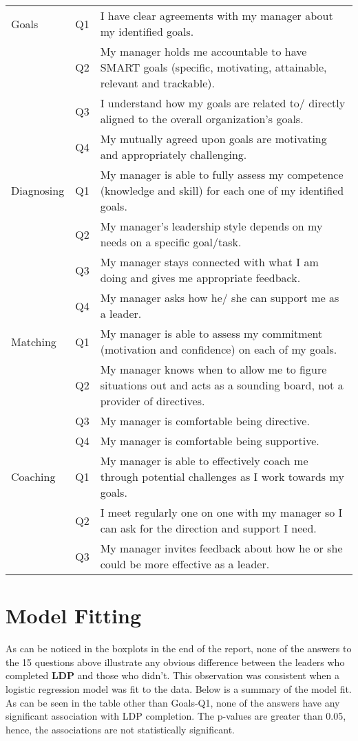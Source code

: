 \documentclass[11pt]{extarticle} %
\begin{document}
\begin{table}[H]
\centering
\begin{tabular}{l|c|p{5in}}
\hline
Goals 		& Q1 & I have clear agreements with my manager about my identified goals. \\
      		& Q2 & My manager holds me accountable to have SMART goals (specific, motivating, attainable, relevant and trackable). \\
      		& Q3 & I understand how my goals are related to/ directly aligned to the overall organization’s goals. \\
		& Q4 & My mutually agreed upon goals are motivating and appropriately challenging. \\
\hline
Diagnosing	& Q1 & My manager is able to fully assess my competence (knowledge and skill) for each one of my identified goals. \\
		& Q2 & My manager’s leadership style depends on my needs on a specific goal/task. \\
		& Q3 & My manager stays connected with what I am doing and gives me appropriate feedback. \\
		& Q4 & My manager asks how he/ she can support me as a leader.\\
\hline
Matching	& Q1 & My manager is able to assess my commitment (motivation and confidence) on each of my goals. \\
		& Q2 & My manager knows when to allow me to figure situations out and acts as a sounding board, not a provider of directives. \\
		& Q3 & My manager is comfortable being directive. \\
		& Q4 & My manager is comfortable being supportive. \\
\hline
Coaching	& Q1 & My manager is able to effectively coach me through potential challenges as I work towards my goals. \\
		& Q2 & I meet regularly one on one with my manager so I can ask for the direction and support I need. \\
		& Q3 & My manager invites feedback about how he or she could be more effective as a leader. \\
\hline
\end{tabular}
\end{table}

\section*{Model Fitting}
As can be noticed in the boxplots in the end of the report, none of the answers to the 15 questions above illustrate any obvious difference between the leaders who completed {\bf{LDP}} and those who didn't. This observation was consistent when a logistic regression model was fit to the data. Below is a summary of the model fit. As can be seen in the table other than Goals-Q1, none of the answers have any significant association with LDP completion. The p-values are greater than 0.05, hence, the associations are not statistically significant. 
\end{document}
